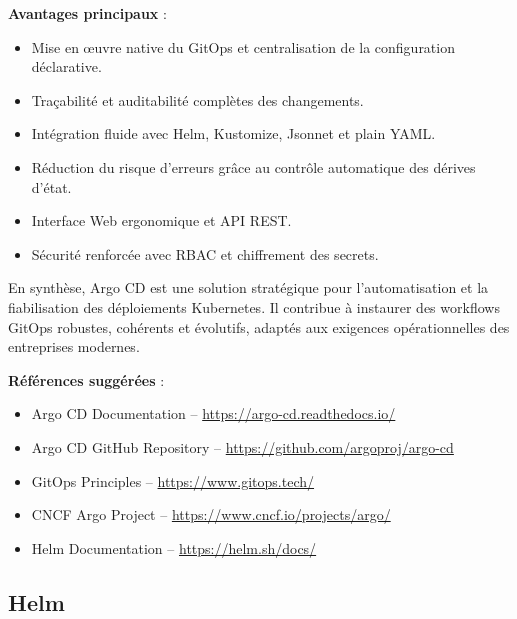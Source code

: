 \textbf{Avantages principaux} :
\begin{itemize}
	\item Mise en œuvre native du GitOps et centralisation de la configuration déclarative.
	\item Traçabilité et auditabilité complètes des changements.
	\item Intégration fluide avec Helm, Kustomize, Jsonnet et plain YAML.
	\item Réduction du risque d’erreurs grâce au contrôle automatique des dérives d’état.
	\item Interface Web ergonomique et API REST.
	\item Sécurité renforcée avec RBAC et chiffrement des secrets.
\end{itemize}

En synthèse, Argo CD est une solution stratégique pour l’automatisation et la fiabilisation des déploiements Kubernetes. Il contribue à instaurer des workflows GitOps robustes, cohérents et évolutifs, adaptés aux exigences opérationnelles des entreprises modernes.

\textbf{Références suggérées} :
\begin{itemize}
	\item Argo CD Documentation – \url{https://argo-cd.readthedocs.io/}
	\item Argo CD GitHub Repository – \url{https://github.com/argoproj/argo-cd}
	\item GitOps Principles – \url{https://www.gitops.tech/}
	\item CNCF Argo Project – \url{https://www.cncf.io/projects/argo/}
	\item Helm Documentation – \url{https://helm.sh/docs/}
\end{itemize}

\subsection{Helm}

